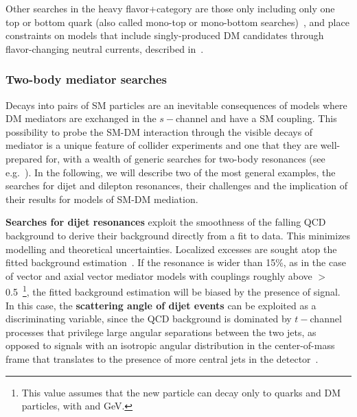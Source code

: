 Other searches in the heavy flavor+\MET category are those only
including only one top or bottom quark
(also called mono-top or mono-bottom searches)~\cite{CMS-PAS-EXO-16-051, Aad:2014wza},
and place constraints on models that include singly-produced DM candidates
through flavor-changing neutral currents, described in~\cite{Boucheneb:2014wza}. 


\subsubsection{Two-body mediator searches}
\label{sub:twoBody}

Decays into pairs of SM particles are an inevitable consequences of models where
DM mediators are exchanged in the $s-$channel and have a SM coupling. 
This possibility to probe the SM-DM interaction through the visible 
decays of mediator is a unique feature of collider experiments
and one that they are well-prepared for, with a wealth of generic searches for
two-body resonances (see e.g.~\cite{Harris:2011bh}).
In the following, we will describe two of the most general examples,
the searches for dijet and dilepton resonances, their challenges and the implication of their results
for models of SM-DM mediation. %

\textbf{Searches for dijet resonances} exploit the smoothness of the falling QCD background
to derive their background directly from a fit to data. This minimizes modelling
and theoretical uncertainties. Localized excesses are sought atop %
the fitted background estimation~\cite{Aaboud:2017yvp,CMS-PAS-EXO-16-056}. 
If the resonance is wider than 15\%, as in the case of 
vector and axial vector mediator models with couplings roughly above \gq$>$0.5~\footnote{This value
assumes that the new particle can decay only to quarks and DM particles, with  and  GeV.}, 
the fitted background estimation will be biased by the presence of signal. 
In this case, the \textbf{scattering angle of dijet events} can be exploited as a discriminating variable, 
since the QCD background is dominated by $t-$channel processes that privilege
large angular separations between the two jets, as opposed to signals with an isotropic angular distribution
in the center-of-mass frame that translates to the presence of more central jets in the
detector~\cite{CMS-PAS-EXO-16-046,Aaboud:2017yvp}.  

